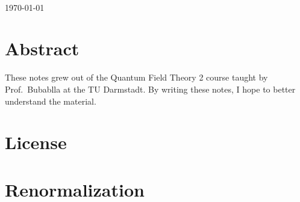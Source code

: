 \documentclass[12pt]{memoir}
\begin{document}
\begin{titlingpage}
\begin{minipage}{0.4\textwidth}
\end{minipage}\\[2cm]



{\large \today}\\[2cm] %

\vfill %

\end{titlingpage}


\chapter{Abstract}
These notes grew out of the Quantum Field Theory 2 course
taught by Prof.~Bubablla at the TU Darmstadt.
By writing these notes, I hope to better understand the material.

\chapter{License}
\doclicenseThis{}




\cleardoublepage\tableofcontents

\cleardoublepage\listoftables

\cleardoublepage\listoffigures



\mainmatter{}

\chapter{Renormalization}
\end{document}
